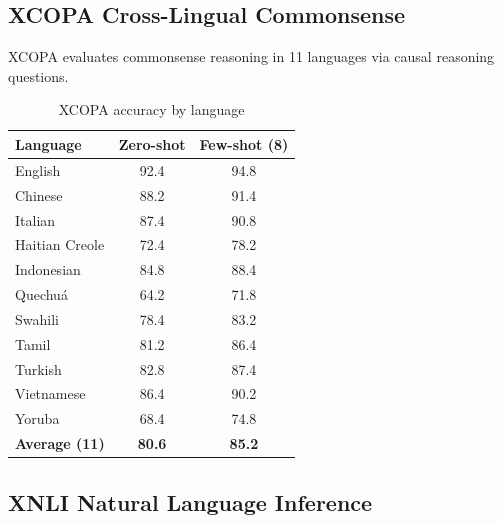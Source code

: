 \documentclass[11pt,a4paper]{article}
\begin{document}
\subsection{XCOPA Cross-Lingual Commonsense}

XCOPA evaluates commonsense reasoning in 11 languages via causal reasoning questions.

\begin{table}[H]
\centering
\caption{XCOPA accuracy by language}
\label{tab:xcopa}
\begin{tabular}{lcc}
\toprule
Language & Zero-shot & Few-shot (8) \\
\midrule
English & 92.4 & 94.8 \\
Chinese & 88.2 & 91.4 \\
Italian & 87.4 & 90.8 \\
Haitian Creole & 72.4 & 78.2 \\
Indonesian & 84.8 & 88.4 \\
Quechu\'a & 64.2 & 71.8 \\
Swahili & 78.4 & 83.2 \\
Tamil & 81.2 & 86.4 \\
Turkish & 82.8 & 87.4 \\
Vietnamese & 86.4 & 90.2 \\
Yoruba & 68.4 & 74.8 \\
\midrule
\textbf{Average (11)} & \textbf{80.6} & \textbf{85.2} \\
\bottomrule
\end{tabular}
\end{table}

\subsection{XNLI Natural Language Inference}
\end{document}
